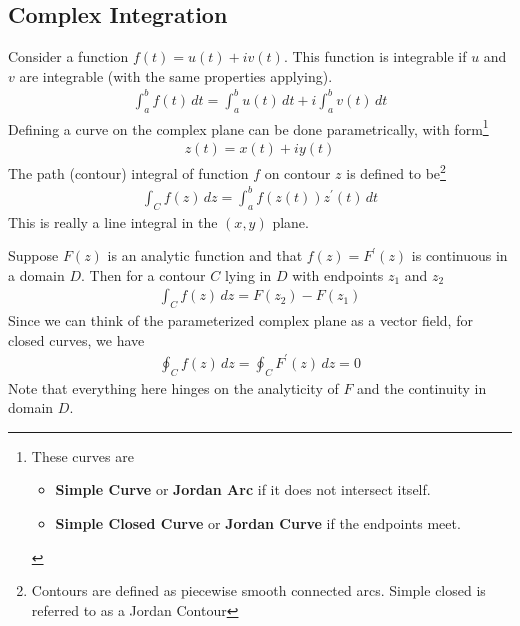     \subsection{Complex Integration}
    Consider a function $f(t) = u(t) + i v(t)$. This function is integrable
    if $u$ and $v$ are integrable (with the same properties applying).
    \begin{align*}
        \int_a^b f(t) \, dt = \int_a^b u(t) \, dt + i \int_a^b v(t) \, dt
    \end{align*}
    Defining a curve on the complex plane can be done parametrically, with
    form\footnote{These curves are
        \begin{itemize}
            \item \textbf{Simple Curve} or \textbf{Jordan Arc} if it does not
            intersect itself.
            \item \textbf{Simple Closed Curve} or \textbf{Jordan Curve} if the
            endpoints meet.
        \end{itemize}}
    \begin{align*}
        z(t) = x(t) + i y(t)
    \end{align*}
    The path (contour) integral of function $f$ on contour $z$ is defined to
    be\footnote{Contours are defined as piecewise smooth connected arcs.
    Simple closed is referred to as a Jordan Contour}
    \begin{align*}
        \int_C f(z) \, dz = \int_a^b f(z(t))z^\prime(t) \, dt
    \end{align*}
    This is really a line integral in the $(x, y)$ plane.

    \begin{thm}
        Suppose $F(z)$ is an analytic function and that $f(z) = F^\prime(z)$
        is continuous in a domain $D$. Then for a contour $C$ lying in $D$
        with endpoints $z_1$ and $z_2$
        \begin{align*}
            \int_C f(z) \, dz = F(z_2) - F(z_1)
        \end{align*}
        Since we can think of the parameterized complex plane as a vector
        field, for closed curves, we have
        \begin{align*}
            \oint_C f(z) \, dz = \oint_C F^\prime(z) \, dz = 0
        \end{align*}
        Note that everything here hinges on the analyticity of $F$ and the
        continuity in domain $D$.
    \end{thm}

